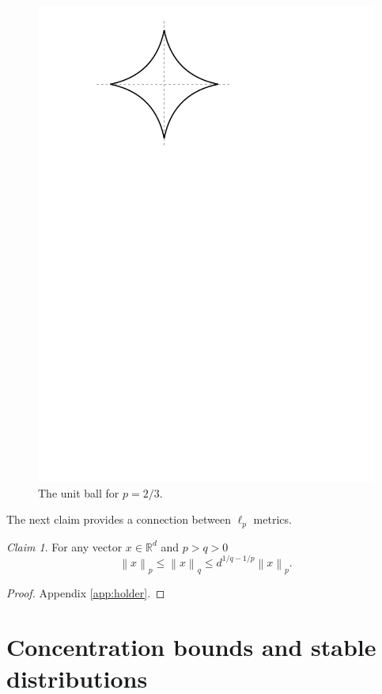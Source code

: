 \documentclass[10pt,a4paper,twoside]{book}
\renewcommand\qedsymbol{$\blacksquare$}
\newcommand{\rd}{\mathbb{R}^{d}}
\newcommand{\norm}[1]{\left \rVert {#1} \right \rVert}
\theoremstyle{definition}
\theoremstyle{remark}
\newtheorem{claim}[definition]{Claim}
\begin{document}
\begin{figure}[ht]
    \centering
    \includegraphics[scale=0.5]{figures/lpnorm2.pdf}
    \caption{The unit ball for $p=2/3$.}
    \label{fig:lpnorm2}
\end{figure}
The next claim provides a connection between $\ell_p$ metrics. 
\begin{claim} \label{ineq:norm}
For any vector $x \in \rd$ and $p>q>0$
\[ \norm{x}_p \leq \norm{x}_q \leq d^{1/q-1/p} \norm{x}_p. \]
\end{claim}
\begin{proof} \renewcommand{\qedsymbol}{}
Appendix \ref{app:holder}.
\end{proof}
\section{Concentration bounds and stable distributions}
\end{document}
